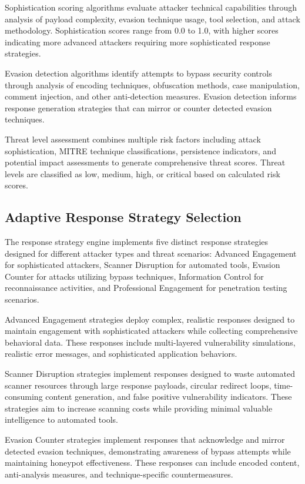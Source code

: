 Sophistication scoring algorithms evaluate attacker technical capabilities through analysis of payload complexity, evasion technique usage, tool selection, and attack methodology. Sophistication scores range from 0.0 to 1.0, with higher scores indicating more advanced attackers requiring more sophisticated response strategies.

Evasion detection algorithms identify attempts to bypass security controls through analysis of encoding techniques, obfuscation methods, case manipulation, comment injection, and other anti-detection measures. Evasion detection informs response generation strategies that can mirror or counter detected evasion techniques.

Threat level assessment combines multiple risk factors including attack sophistication, MITRE technique classifications, persistence indicators, and potential impact assessments to generate comprehensive threat scores. Threat levels are classified as low, medium, high, or critical based on calculated risk scores.

\subsection{Adaptive Response Strategy Selection}

The response strategy engine implements five distinct response strategies designed for different attacker types and threat scenarios: Advanced Engagement for sophisticated attackers, Scanner Disruption for automated tools, Evasion Counter for attacks utilizing bypass techniques, Information Control for reconnaissance activities, and Professional Engagement for penetration testing scenarios.

Advanced Engagement strategies deploy complex, realistic responses designed to maintain engagement with sophisticated attackers while collecting comprehensive behavioral data. These responses include multi-layered vulnerability simulations, realistic error messages, and sophisticated application behaviors.

Scanner Disruption strategies implement responses designed to waste automated scanner resources through large response payloads, circular redirect loops, time-consuming content generation, and false positive vulnerability indicators. These strategies aim to increase scanning costs while providing minimal valuable intelligence to automated tools.

Evasion Counter strategies implement responses that acknowledge and mirror detected evasion techniques, demonstrating awareness of bypass attempts while maintaining honeypot effectiveness. These responses can include encoded content, anti-analysis measures, and technique-specific countermeasures.


